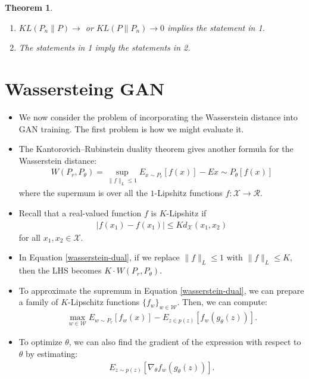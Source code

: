 \documentclass[10pt]{article}
\newtheorem{theorem}[lemma]{Theorem}
\begin{document}
\begin{itemize}
\begin{theorem}
\begin{enumerate}
  			\item $KL(P_n\|P) \rightarrow$ or $KL(P\|P_n) \rightarrow 0$ implies the statement in 1.

  			\item The statements in 1 imply the statements in 2.
  		\end{enumerate}  	
  	\end{theorem}
  \end{itemize}

  \section{Wassersteing GAN}

  \begin{itemize}
  	\item We now consider the problem of incorporating the Wasserstein distance into GAN training. The first problem is how we might evaluate it.

  	\item The Kantorovich--Rubinstein duality theorem gives another formula for the Wasserstein distance:
  	\begin{align}
  		W(P_r,P_\theta) = \sup_{\| f\|_L \leq 1} E_{x \sim P_r}[f(x)] - E{x \sim P_\theta} [f(x)] \label{wasserstein-dual}
  	\end{align}
  	where the supermum is over all the $1$-Lipshitz functions $f: \mathcal{X} \rightarrow \mathcal{R}$.

  	\item Recall that a real-valued function $f$ is $K$-Lipshitz if
  	\begin{align*}
  		|f(x_1) - f(x_1)| \leq K d_{\mathcal{X}}(x_1, x_2)
  	\end{align*}
  	for all $x_1, x_2 \in \mathcal{X}$.

  	\item In Equation \eqref{wasserstein-dual}, if we replace $\| f \|_L \leq 1$ with $\| f\|_L \leq K$, then the LHS becomes $K \cdot W(P_r, P_\theta)$.

  	\item To approximate the supremum in Equation \eqref{wasserstein-dual}, we can prepare a family of $K$-Lipschitz functions $\{ f_w \}_{w \in \mathcal{W}}$. Then, we can compute:
  	\begin{align*}
  		\max_{w \in \mathcal{W}} E_{w \sim P_r} [f_w(x)] - E_{z \in p(z)} [f_w(g_\theta(z))].
  	\end{align*}
  	
  	\item To optimize $\theta$, we can also find the gradient of the expression with respect to $\theta$ by estimating:
  	\begin{align*}
  		E_{z \sim p(z)} [\nabla_\theta f_w(g_\theta(z))].
  	\end{align*}


\end{itemize}
\end{document}
